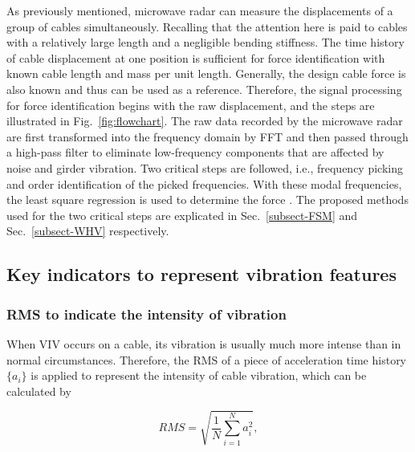 \documentclass[preprint, 3p, times, compress, 11pt]{elsarticle}
\begin{document}
As previously mentioned, microwave radar can measure the 
displacements of a group of cables simultaneously. Recalling that the 
attention here is paid to cables with a relatively large length and a 
negligible bending stiffness. The time history of cable displacement at one position is 
sufficient for force identification with known cable length and mass per 
unit length. Generally, the design cable force is also known and thus 
can be used as a reference. Therefore, the signal processing for force 
identification begins with the raw displacement, and the steps are 
illustrated in Fig.~\ref{fig:flowchart}. The raw data recorded by the 
microwave radar are first transformed into the frequency domain by FFT and 
then passed through a high-pass filter to eliminate low-frequency 
components that are affected by noise and girder vibration. Two critical 
steps are followed, i.e., frequency picking and order identification of 
the picked frequencies. With these modal frequencies, the least square 
regression is used to determine the force \cite{zui1996practical}. The 
proposed methods used for the two critical steps are explicated in 
Sec.~\ref{subsect-FSM} and Sec.~\ref{subsect-WHV} respectively.


\subsection{Key indicators to represent vibration features} 
\label{sec:indicator}

\subsubsection{RMS to indicate the intensity of vibration}

When VIV occurs on a cable, its vibration is usually much more intense 
than in normal circumstances. Therefore, the RMS of a piece of 
acceleration time history $\{a_i\}$ is applied to represent the intensity 
of cable vibration, which can be calculated by 

\begin{equation}
    RMS = \sqrt{\frac{1}{N} \sum_{i=1}^{N} a_{i}^{2}},
    \label{eq:RMS}
\end{equation}
\end{document}
